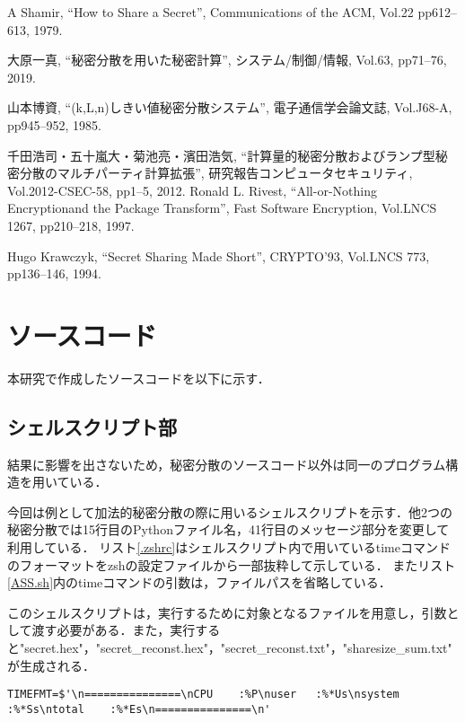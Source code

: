 \documentclass[10pt, a4paper, titlepage]{jsreport}
\begin{document}
	\begin{thebibliography}{99}
			A Shamir,
			``How to Share a Secret'',
			Communications of the ACM, Vol.22 pp612--613, 1979.

			大原一真,
			``秘密分散を用いた秘密計算'',
			システム/制御/情報, Vol.63, pp71--76, 2019.

			山本博資,
			``(k,L,n)しきい値秘密分散システム'',
			電子通信学会論文誌, Vol.J68-A, pp945--952, 1985.

			千田浩司・五十嵐大・菊池亮・濱田浩気,
			``計算量的秘密分散およびランプ型秘密分散のマルチパーティ計算拡張'',
			研究報告コンピュータセキュリティ, Vol.2012-CSEC-58, pp1--5, 2012.
			Ronald L. Rivest,
			``All-or-Nothing Encryptionand the Package Transform'',
			Fast Software Encryption, Vol.LNCS 1267, pp210--218, 1997.

			Hugo Krawczyk,
			``Secret Sharing Made Short'',
			CRYPTO'93, Vol.LNCS 773, pp136--146, 1994.
	\end{thebibliography}

	\appendix
	\chapter{ソースコード}

	本研究で作成したソースコードを以下に示す．

	\section{シェルスクリプト部}
	結果に影響を出さないため，秘密分散のソースコード以外は同一のプログラム構造を用いている．

	今回は例として加法的秘密分散の際に用いるシェルスクリプトを示す．他2つの秘密分散では15行目のPythonファイル名，41行目のメッセージ部分を変更して利用している．
	リスト\ref{.zshrc}はシェルスクリプト内で用いているtimeコマンドのフォーマットをzshの設定ファイルから一部抜粋して示している．
	またリスト\ref{ASS.sh}内のtimeコマンドの引数は，ファイルパスを省略している．

	このシェルスクリプトは，実行するために対象となるファイルを用意し，引数として渡す必要がある．また，実行すると"secret.hex"，"secret\_reconst.hex"，"secret\_reconst.txt"，"sharesize\_sum.txt"が生成される．

	\begin{lstlisting}[caption=.zshrc(一部抜粋), label=.zshrc]
TIMEFMT=$'\n===============\nCPU	:%P\nuser	:%*Us\nsystem	:%*Ss\ntotal	:%*Es\n===============\n'
	\end{lstlisting}
\end{document}
